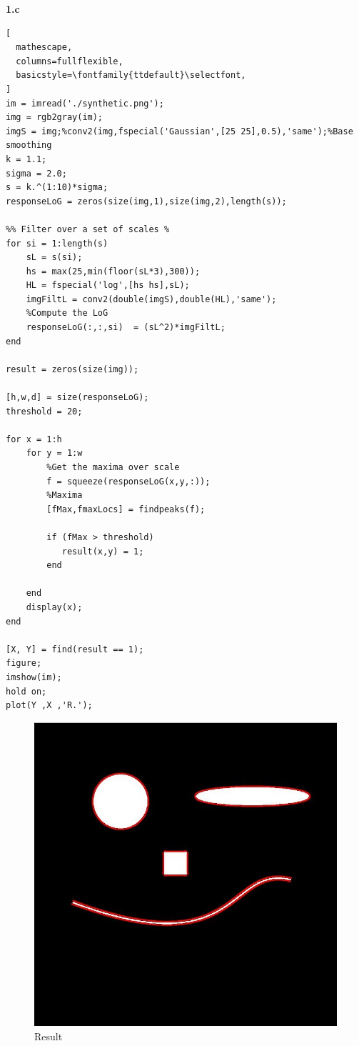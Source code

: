 \documentclass[11pt]{article}
\begin{document}
\newpage
\noindent
\textbf{1.c} \\
\begin{lstlisting}[
  mathescape,
  columns=fullflexible,
  basicstyle=\fontfamily{ttdefault}\selectfont,
]
im = imread('./synthetic.png');
img = rgb2gray(im);
imgS = img;%conv2(img,fspecial('Gaussian',[25 25],0.5),'same');%Base smoothing
k = 1.1;
sigma = 2.0;
s = k.^(1:10)*sigma;
responseLoG = zeros(size(img,1),size(img,2),length(s));

%% Filter over a set of scales %
for si = 1:length(s)
    sL = s(si);
    hs = max(25,min(floor(sL*3),300));
    HL = fspecial('log',[hs hs],sL);
    imgFiltL = conv2(double(imgS),double(HL),'same');
    %Compute the LoG
    responseLoG(:,:,si)  = (sL^2)*imgFiltL;
end

result = zeros(size(img));

[h,w,d] = size(responseLoG);
threshold = 20;

for x = 1:h
    for y = 1:w
        %Get the maxima over scale
        f = squeeze(responseLoG(x,y,:));
        %Maxima
        [fMax,fmaxLocs] = findpeaks(f);
        
        if (fMax > threshold)
           result(x,y) = 1;
        end
        
    end
    display(x);
end

[X, Y] = find(result == 1);
figure;
imshow(im);
hold on;
plot(Y ,X ,'R.');

\end{lstlisting}
\newpage
\begin{figure}[h]
  \caption{Result}
    \includegraphics[width=1\textwidth]{1c}
\end{figure}
\end{document}
